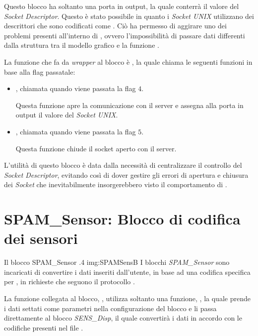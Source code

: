 Questo blocco ha soltanto una porta in output, la quale conterrà il valore
del \emph{Socket Descriptor}. Questo è stato possibile in quanto i
\emph{Socket UNIX} utilizzano dei descrittori che sono codificati come
. Ciò ha permesso di aggirare uno dei problemi presenti
all'interno di \SciCos{}, ovvero l'impossibilità di passare dati differenti
dalla struttura  tra il modello grafico e la
funzione .

La funzione che fa da \emph{wrapper} al blocco è \linebreak {}, la quale chiama le seguenti
funzioni in base alla flag passatale:
\begin{itemize}
    \item {}, chiamata quando
        viene passata la flag $4$. 

        Questa funzione apre la comunicazione con il server e assegna alla
        porta in output il valore del \emph{Socket UNIX}.
    \item {}, chiamata quando
        viene passata la flag $5$.

        Questa funzione chiude il socket aperto con il server.
\end{itemize}

L'utilità di questo blocco è data dalla necessità di centralizzare il
controllo del \emph{Socket Descriptor}, evitando così di dover gestire gli
errori di apertura e chiusura dei \emph{Socket} che inevitabilmente
insorgerebbero visto il comportamento di \SciCos{}.

\section[SPAM\_Sensor]{SPAM\_Sensor: Blocco di codifica dei sensori}
\label{sec:SPAMSensS}
        {Il blocco SPAM\_Sensor}
        {.4}
        {img:SPAMSensB}
I blocchi \emph{SPAM\_Sensor} sono incaricati di convertire i dati inseriti
dall'utente, in base ad una codifica specifica per \SciCos{}, in richieste
che seguono il protocollo \BROFist{}.

La funzione collegata al blocco, , utilizza soltanto una funzione, , la quale prende i dati settati come
parametri nella configurazione del blocco e li passa direttamente al blocco
\emph{SENS\_Disp}, il quale convertirà i dati in accordo con le codifiche
presenti nel file .

